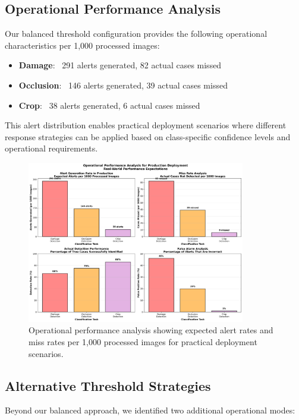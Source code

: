 \documentclass[12pt]{article}
\begin{document}
\subsection{Operational Performance Analysis}

Our balanced threshold configuration provides the following operational characteristics per 1,000 processed images:

\begin{itemize}[itemsep=1pt,parsep=0pt,topsep=3pt]
\item \textbf{Damage}: ~291 alerts generated, 82 actual cases missed
\item \textbf{Occlusion}: ~146 alerts generated, 39 actual cases missed  
\item \textbf{Crop}: ~38 alerts generated, 6 actual cases missed
\end{itemize}

This alert distribution enables practical deployment scenarios where different response strategies can be applied based on class-specific confidence levels and operational requirements.

\begin{figure}[!htb]
\centering
\includegraphics[width=0.85\textwidth]{images/operational_performance_analysis.png}
\caption{Operational performance analysis showing expected alert rates and miss rates per 1,000 processed images for practical deployment scenarios.}
\end{figure}

\subsection{Alternative Threshold Strategies}

Beyond our balanced approach, we identified two additional operational modes:
\end{document}
